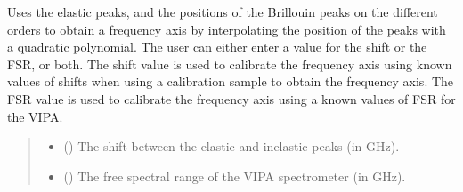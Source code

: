 \documentclass[letterpaper,10pt,english]{sphinxmanual}
\begin{document}
\begin{fulllineitems}
\begin{fulllineitems}
\begin{quote}
\begin{description}
\end{description}\end{quote}

\end{fulllineitems}


\begin{fulllineitems}
\label{\detokenize{_autosummary/HDF5_BLS.analyze:HDF5_BLS.analyze.Analyze_VIPA.interpolate_elastic_inelastic}}
\pysigstartsignatures
\pysiglinewithargsret
{}
{\sphinxparamcomma {}}
{}
\pysigstopsignatures
\sphinxAtStartPar
Uses the elastic peaks, and the positions of the Brillouin peaks on the different orders to obtain a frequency axis by interpolating the position of the peaks with a quadratic polynomial. The user can either enter a value for the shift or the FSR, or both. The shift value is used to calibrate the frequency axis using known values of shifts when using a calibration sample to obtain the frequency axis. The FSR value is used to calibrate the frequency axis using a known values of FSR for the VIPA.
\begin{quote}\begin{description}
\begin{itemize}
\item {} 
\sphinxAtStartPar
{} () \textendash{} The shift between the elastic and inelastic peaks (in GHz).

\item {} 
\sphinxAtStartPar
{} () \textendash{} The free spectral range of the VIPA spectrometer (in GHz).

\end{itemize}

\end{description}\end{quote}

\end{fulllineitems}


\end{fulllineitems}
\end{document}
